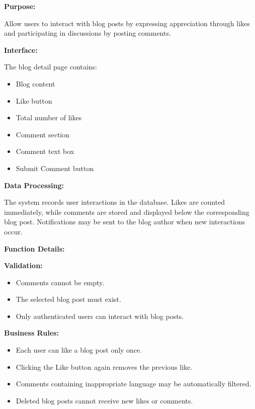 \textbf{Purpose:}

Allow users to interact with blog posts by expressing appreciation through likes and participating in discussions by posting comments.

\vspace{0.2cm}

\textbf{Interface:}

The blog detail page contains:

\begin{itemize}
    \item Blog content
    \item Like button
    \item Total number of likes
    \item Comment section
    \item Comment text box
    \item Submit Comment button
\end{itemize}

\vspace{0.2cm}

\textbf{Data Processing:}

The system records user interactions in the database. Likes are counted immediately, while comments are stored and displayed below the corresponding blog post. Notifications may be sent to the blog author when new interactions occur.

\vspace{0.3cm}

\textbf{Function Details:}

\textbf{Validation:}

\begin{itemize}
    \item Comments cannot be empty.
    \item The selected blog post must exist.
    \item Only authenticated users can interact with blog posts.
\end{itemize}

\vspace{0.2cm}

\textbf{Business Rules:}

\begin{itemize}
    \item Each user can like a blog post only once.
    \item Clicking the Like button again removes the previous like.
    \item Comments containing inappropriate language may be automatically filtered.
    \item Deleted blog posts cannot receive new likes or comments.
\end{itemize}

